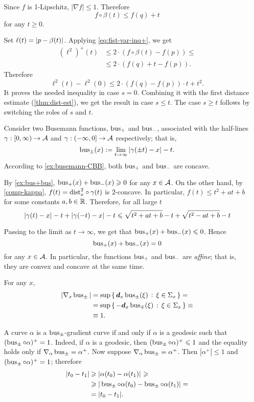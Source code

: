Since $f$ is 1-Lipschitz, $|\nabla f|\le1$.
Therefore 
\[f\circ\beta(t)\le f(q)+t\]
for any $t\ge0$.

Set $\ell(t)=|{p}-{\beta(t)}|_{}^{{}}$.
Applying \ref{eq:fist-var-inq+}, we get
\begin{align*}
(\ell^2)^+(t)
&\le 2\cdot \left(f\circ\beta(t)-f(p)\right)\le 
\\
&\le2\cdot\left(f(q)+t-f(p)\right).
\end{align*}
Therefore 
\[\ell^2(t)-\ell^2(0)\le 2\cdot\left(f(q)-f(p)\right)\cdot t + t^2.\]
It proves the needed inequality in case $s=0$.
Combining it with the first distance estimate (\ref{thm:dist-est}), we get the result in case $s\le t$.
The case $s\ge t$ follows by switching the roles of $s$ and $t$.
\qeds


 Consider two Busemann functions, $\operatorname{\rm bus}\nolimits_+$ and $\operatorname{\rm bus}\nolimits_-$, associated with the  half-lines $\gamma:[0,\infty)\to \mathcal{A}$ and $\gamma:(-\infty,0]\to \mathcal{A}$ respectively; that is,
\[
\operatorname{\rm bus}\nolimits_\pm(x)
\mathrel{:=}
\lim_{t\to\infty}|{\gamma(\pm t)}-{x}|_{}^{{}}- t.
\]
According to \ref{ex:busemann-CBB}, 
both $\operatorname{\rm bus}\nolimits_+$ and $\operatorname{\rm bus}\nolimits_-$ are concave.

By \ref{ex:bus+bus}, $\operatorname{\rm bus}\nolimits_+(x)+\operatorname{\rm bus}\nolimits_-(x)\geqslant0$ for any $x\in \mathcal{A}$.
On the other hand, by \ref{comp-kappa}, 
$f(t)=\mathrm{dist}_x^2\circ\gamma(t)$ 
is $2$-concave.
In particular, $f(t)\le t^2+at+b$ for some constants $a,b\in\mathbb{R}$.  Therefore, for all large $t$
\[
|{\gamma( t)}-{x}|_{}^{{}}- t +|{\gamma(- t)}-{x}|_{}^{{}}- t\leqslant \sqrt{ t^2+at+b}-t+\sqrt{ t^2-at+b}-t
\]

Passing to the limit as $t\to\infty$, we get that  $\operatorname{\rm bus}\nolimits_+(x)+\operatorname{\rm bus}\nolimits_-(x)\leqslant 0$.
Hence
\[
\operatorname{\rm bus}\nolimits_+(x)+\operatorname{\rm bus}\nolimits_-(x)= 0
\]
for any $x\in \mathcal{A}$.
In particular, the functions $\operatorname{\rm bus}\nolimits_+$ and $\operatorname{\rm bus}\nolimits_-$ are \emph{affine};
that is, they are convex and concave at the same time.

For any $x$,
\begin{align*}
|\nabla_x \operatorname{\rm bus}\nolimits_\pm|
&=\sup\left\{\,{\bm{d}_x\operatorname{\rm bus}\nolimits_\pm(\xi)}\,:\,{\xi\in\Sigma_x}\,\right\}=
\\
&=\sup\left\{\,{-\bm{d}_x\operatorname{\rm bus}\nolimits_\mp(\xi)}\,:\,{\xi\in\Sigma_x}\,\right\}\equiv
\\
&\equiv1.
\end{align*}

A curve $\alpha$ is a $\operatorname{\rm bus}\nolimits_\pm$-gradient curve
if and only if $\alpha$ is a geodesic such that $(\operatorname{\rm bus}\nolimits_\pm\circ\alpha)^+=1$.
Indeed, if $\alpha$ is a geodesic, then $(\operatorname{\rm bus}\nolimits_\pm\circ\alpha)^+\leqslant 1$ and the equality holds only if $\nabla_\alpha\operatorname{\rm bus}\nolimits_\pm=\alpha^+$.
Now suppose $\nabla_\alpha\operatorname{\rm bus}\nolimits_\pm=\alpha^+$.
Then $|\alpha^+|\le 1$ and $(\operatorname{\rm bus}\nolimits_\pm\circ\alpha)^+=1$; therefore 
\begin{align*}
|t_0-t_1|&\geqslant |{\alpha(t_0)}-{\alpha(t_1)}|_{}^{{}}\geqslant
\\
&\geqslant|\operatorname{\rm bus}\nolimits_\pm\circ\alpha(t_0)-\operatorname{\rm bus}\nolimits_\pm\circ\alpha(t_1)|=
\\
&=|t_0-t_1|.
\end{align*}

